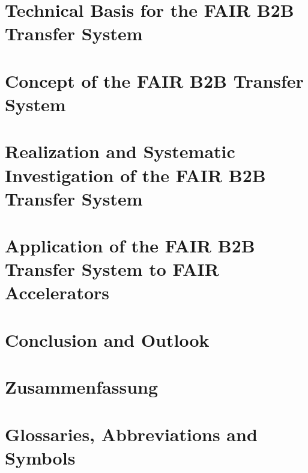 \documentclass[12pt,twoside]{report}
\renewcommand{\_}{%
  \textunderscore\hspace{0pt}%
}
\begin{document}
\chapter{Technical Basis for the FAIR B2B Transfer System}\label{technical}

\chapter{Concept of the FAIR B2B Transfer System}\label{concept}

\chapter{Realization and Systematic Investigation of the FAIR B2B Transfer System}\label{realization}

\chapter{Application of the FAIR B2B Transfer System to FAIR Accelerators}\label{application}

%
\chapter*{Conclusion and Outlook}

\chapter*{Zusammenfassung}

%

\appendix
\chapter*{Glossaries, Abbreviations and Symbols}
\printnoidxglossary
\end{document}

